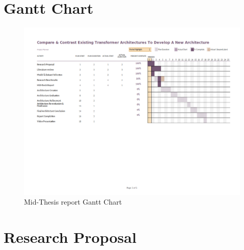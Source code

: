 \documentclass[a4paper,12pt]{report}
\begin{document}
   \begin{appendices}
    	\chapter{Gantt Chart}\label{cgc}
		    \begin{figure}[!h]
		       	\centering
		        \includegraphics[scale=0.55,angle=90]{../images/GanttChart-mid.png}
		     	\caption{Mid-Thesis report Gantt Chart}\label{ganttChartMid}
              \end{figure}
         \chapter{Research Proposal}\label{crp}
         
    \end{appendices}

\end{document}
